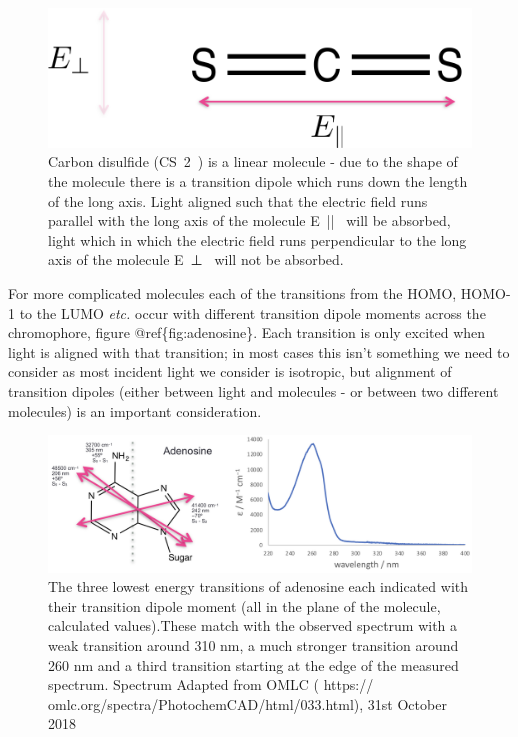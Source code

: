 \documentclass[
]{book}
\begin{document}
\begin{figure}

{\centering \includegraphics[width=0.6\linewidth]{images/CS2} 

}

\caption{Carbon disulfide (CS~2~) is a linear molecule -  due to the shape of the molecule there is a transition dipole which runs down the length of the long axis. Light aligned such that the electric field runs parallel with the long axis of the molecule E~||~ will be absorbed, light which in which the electric field runs perpendicular to the long axis of the molecule E~⊥~ will not be absorbed.}\label{fig:CS2}
\end{figure}

For more complicated molecules each of the transitions from the HOMO, HOMO-1 to the LUMO \emph{etc.} occur with different transition dipole moments across the chromophore, figure @ref\{fig:adenosine\}. Each transition is only excited when light is aligned with that transition; in most cases this isn't something we need to consider as most incident light we consider is isotropic, but alignment of transition dipoles (either between light and molecules - or between two different molecules) is an important consideration.

\begin{figure}

{\centering \includegraphics[width=1\linewidth]{images/adenosine} 

}

\caption{The three lowest energy transitions of adenosine each indicated with their transition dipole moment (all in the plane of the molecule, calculated values).These match with the observed spectrum with a weak transition around 310 nm, a much stronger transition around 260 nm and a third transition starting at the edge of the measured spectrum. Spectrum Adapted from OMLC ( https:// omlc.org/spectra/PhotochemCAD/html/033.html), 31st October 2018}\label{fig:adenosine}
\end{figure}
\end{document}
